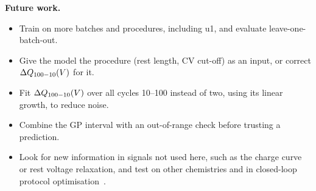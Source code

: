 \textbf{Future work.}
\begin{itemize}
  \item Train on more batches and procedures, including u1, and evaluate
  leave-one-batch-out.
  \item Give the model the procedure (rest length, CV cut-off) as an input,
  or correct $\Delta Q_{100-10}(V)$ for it.
  \item Fit $\Delta Q_{100-10}(V)$ over all cycles 10--100 instead of two, using its linear
  growth, to reduce noise.
  \item Combine the GP interval with an out-of-range check before trusting a
  prediction.
  \item Look for new information in signals not used here, such as the
  charge curve or rest voltage relaxation, and test on other chemistries and
  in closed-loop protocol optimisation~\cite{attia2020}.
\end{itemize}
